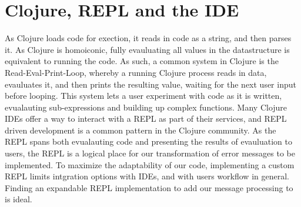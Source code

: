 \documentclass[12pt]{article}
\newcommand{\comment}[1]{{\bf \tt  {#1}}}
\newcommand{\emcomment}[1]{\textcolor{ForestGreen}{\comment{Elena: {#1}}}}
\begin{document}


\section{Clojure, REPL and the IDE}
As Clojure loads code for exection, it reads in code as a string,
and then parses it. As Clojure is homoiconic, fully evauluating all values in the datastructure
is equivalent to running the code.
As such, a common system in Clojure is the Read-Eval-Print-Loop, whereby a running Clojure
process reads in data, evauluates it, and then prints the resulting value,
 waiting for the next user input before looping.
This system lets a user experiment with code as it is written,
 evualauting sub-expressions and building up complex functions.
Many Clojure IDEs offer a way to interact with a REPL as part of their services,
 and REPL driven development is a common pattern in the Clojure community.
 As the REPL spans both evualauting code and presenting the results of evauluation to users,
 the REPL is a logical place for our transformation of error messages to be implemented.
 To maximize the adaptability of our code, implementing a custom REPL limits intgration
 options with IDEs, and with users workflow in general.
  Finding an expandable REPL implementation to add our message processing to
  is ideal.
\end{document}
